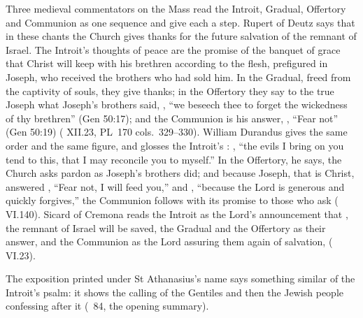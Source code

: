 Three medieval commentators on the Mass read the Introit, Gradual, Offertory
and Communion as one sequence and give each a step. Rupert of Deutz says that
in these chants the Church gives thanks for the future salvation of the
remnant of Israel. The Introit's thoughts of peace are the
promise of the banquet of grace that Christ will keep with his brethren
according to the flesh, prefigured in Joseph, who received the brothers who
had sold him. In the Gradual, freed from the captivity of souls, they give
thanks; in the Offertory they say to the true Joseph what Joseph's brothers
said, , ``we beseech thee
to forget the wickedness of thy brethren'' (Gen 50:17); and the Communion is
his answer, , ``Fear not'' (Gen 50:19) ( XII.23, PL~170 cols.~329--330). William Durandus gives the same
order and the same figure, and glosses the Introit's : , ``the evils I bring on you tend to this, that I may reconcile you
to myself.'' In the Offertory, he says, the Church asks pardon as Joseph's
brothers did; and because Joseph, that is Christ, answered , ``Fear not, I will feed you,'' and , ``because the Lord is generous and
quickly forgives,'' the Communion follows with its promise to those who ask
( VI.140). Sicard of Cremona reads the Introit as the Lord's
announcement that , the remnant of
Israel will be saved, the Gradual and the Offertory as their answer, and the
Communion as the Lord assuring them again of salvation,  ( VI.23).

The exposition printed under St Athanasius's name says something similar of
the Introit's psalm: it shows the calling of the Gentiles and then the Jewish
people confessing after it (\ 84, the opening
summary).

